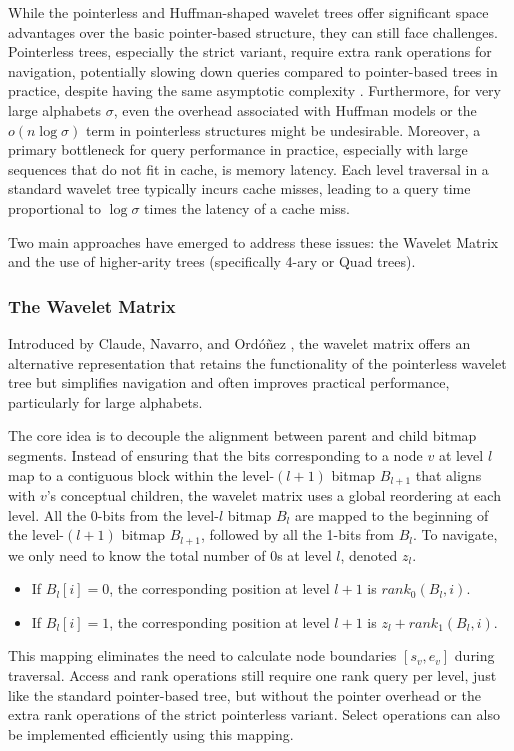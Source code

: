 While the pointerless and Huffman-shaped wavelet trees offer significant space advantages over the basic pointer-based structure, they can still face challenges. Pointerless trees, especially the strict variant, require extra rank operations for navigation, potentially slowing down queries compared to pointer-based trees in practice, despite having the same asymptotic complexity \cite{claude2015wavelet}. Furthermore, for very large alphabets $\sigma$, even the overhead associated with Huffman models or the $o(n \log \sigma)$ term in pointerless structures might be undesirable. Moreover, a primary bottleneck for query performance in practice, especially with large sequences that do not fit in cache, is memory latency. Each level traversal in a standard wavelet tree typically incurs cache misses, leading to a query time proportional to $\log \sigma$ times the latency of a cache miss.

Two main approaches have emerged to address these issues: the Wavelet Matrix and the use of higher-arity trees (specifically 4-ary or Quad trees).

\subsubsection{The Wavelet Matrix}
Introduced by Claude, Navarro, and Ordóñez \cite{claude2015wavelet}, the wavelet matrix offers an alternative representation that retains the functionality of the pointerless wavelet tree but simplifies navigation and often improves practical performance, particularly for large alphabets.

The core idea is to decouple the alignment between parent and child bitmap segments. Instead of ensuring that the bits corresponding to a node $v$ at level $l$ map to a contiguous block within the level-$(l+1)$ bitmap $B_{l+1}$ that aligns with $v$'s conceptual children, the wavelet matrix uses a global reordering at each level. All the 0-bits from the level-$l$ bitmap $B_l$ are mapped to the beginning of the level-$(l+1)$ bitmap $B_{l+1}$, followed by all the 1-bits from $B_l$. To navigate, we only need to know the total number of 0s at level $l$, denoted $z_l$.
\begin{itemize}
    \item If $B_l[i] = 0$, the corresponding position at level $l+1$ is $rank_0(B_l, i)$.
    \item If $B_l[i] = 1$, the corresponding position at level $l+1$ is $z_l + rank_1(B_l, i)$.
\end{itemize}
This mapping eliminates the need to calculate node boundaries $[s_v, e_v]$ during traversal. Access and rank operations still require one rank query per level, just like the standard pointer-based tree, but without the pointer overhead or the extra rank operations of the strict pointerless variant. Select operations can also be implemented efficiently using this mapping.

